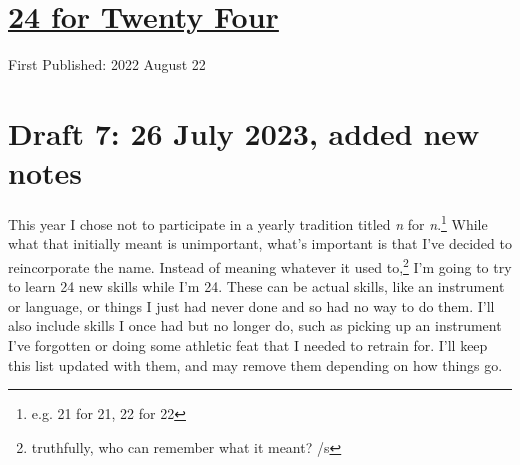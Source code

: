 \documentclass[12pt]{article}[titlepage]
\newcommand{\1}{\={a}}
\newcommand{\2}{\={e}}
\newcommand{\3}{\={\i}}
\newcommand{\4}{\=o}
\newcommand{\5}{\=u}
\newcommand{\6}{\={A}}
\renewcommand{\,}{\textsuperscript{,}}
\begin{document}
\doublespacing
\section{\href{twenty-four-html}{24 for Twenty Four}}
First Published: 2022 August 22

\section{Draft 7: 26 July 2023, added new notes }
This year I chose not to participate in a yearly tradition titled \textit{n} for \textit{n}.\footnote{e.g. 21 for 21, 22 for 22}
While what that initially meant is unimportant, what's important is that I've decided to reincorporate the name.
Instead of meaning whatever it used to,\footnote{truthfully, who can remember what it meant? /s} I'm going to try to learn 24 new skills while I'm 24.
These can be actual skills, like an instrument or language, or things I just had never done and so had no way to do them.
I'll also include skills I once had but no longer do, such as picking up an instrument I've forgotten or doing some athletic feat that I needed to retrain for.
I'll keep this list updated with them, and may remove them depending on how things go.
\end{document}
